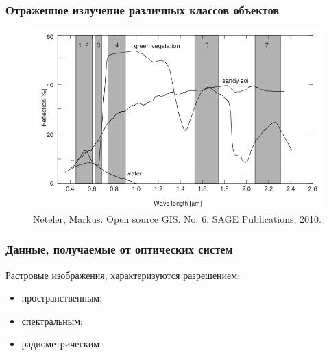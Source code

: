 \begin{frame}
    \frametitle{Отраженное излучение различных классов объектов}
        \begin{figure}[!ht]
        \begin{center}
            \includegraphics[width=1.0\columnwidth]{./remote_sensing/img/reflectance}
        \end{center}
        \caption{\tiny Neteler, Markus. Open source GIS. No. 6. SAGE Publications, 2010.}
    \end{figure}
\end{frame}

\begin{frame}
    \frametitle{Данные, получаемые от оптических систем}
    Растровые изображения, характеризуются разрешением:
    \begin{itemize}
        \item пространственным;
        \item спектральным;
        \item радиометрическим.
    \end{itemize}
\end{frame}

